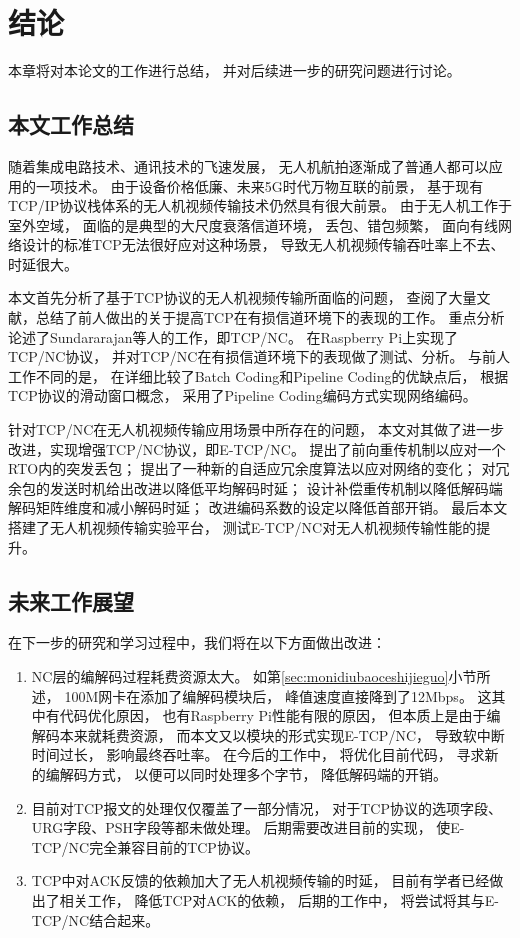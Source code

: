 \chapter*{结\qquad{}论}
本章将对本论文的工作进行总结，
并对后续进一步的研究问题进行讨论。
\section*{本文工作总结}
随着集成电路技术、通讯技术的飞速发展，
无人机航拍逐渐成了普通人都可以应用的一项技术。
由于设备价格低廉、未来5G时代万物互联的前景，
基于现有TCP/IP协议栈体系的无人机视频传输技术仍然具有很大前景。
由于无人机工作于室外空域，
面临的是典型的大尺度衰落信道环境，
丢包、错包频繁，
面向有线网络设计的标准TCP无法很好应对这种场景，
导致无人机视频传输吞吐率上不去、时延很大。
\par
本文首先分析了基于TCP协议的无人机视频传输所面临的问题，
查阅了大量文献，总结了前人做出的关于提高TCP在有损信道环境下的表现的工作。
重点分析论述了Sundararajan等人的工作，即TCP/NC。
在Raspberry Pi上实现了TCP/NC协议，
并对TCP/NC在有损信道环境下的表现做了测试、分析。
与前人工作不同的是，
在详细比较了Batch Coding和Pipeline Coding的优缺点后，
根据TCP协议的滑动窗口概念，
采用了Pipeline Coding编码方式实现网络编码。
\par
针对TCP/NC在无人机视频传输应用场景中所存在的问题，
本文对其做了进一步改进，实现增强TCP/NC协议，即E-TCP/NC。
提出了前向重传机制以应对一个RTO内的突发丢包；
提出了一种新的自适应冗余度算法以应对网络的变化；
对冗余包的发送时机给出改进以降低平均解码时延；
设计补偿重传机制以降低解码端解码矩阵维度和减小解码时延；
改进编码系数的设定以降低首部开销。
最后本文搭建了无人机视频传输实验平台，
测试E-TCP/NC对无人机视频传输性能的提升。

\section*{未来工作展望}
在下一步的研究和学习过程中，我们将在以下方面做出改进：
\begin{enumerate}[fullwidth,itemindent=2em,label=(\arabic*)]
	\item NC层的编解码过程耗费资源太大。
	如第\ref{sec:monidiubaoceshijieguo}小节所述，
	100M网卡在添加了编解码模块后，
	峰值速度直接降到了12Mbps。
	这其中有代码优化原因，
	也有Raspberry Pi性能有限的原因，
	但本质上是由于编解码本来就耗费资源，
	而本文又以模块的形式实现E-TCP/NC，
	导致软中断时间过长，
	影响最终吞吐率。
	在今后的工作中，
	将优化目前代码，
	寻求新的编解码方式，
	以便可以同时处理多个字节，
	降低解码端的开销。
	\item 目前对TCP报文的处理仅仅覆盖了一部分情况，
	对于TCP协议的选项字段、URG字段、PSH字段等都未做处理。
	后期需要改进目前的实现，
	使E-TCP/NC完全兼容目前的TCP协议。
	\item TCP中对ACK反馈的依赖加大了无人机视频传输的时延，
	目前有学者已经做出了相关工作\textsuperscript{\cite{ontheflycoding}}，
	降低TCP对ACK的依赖，
	后期的工作中，
	将尝试将其与E-TCP/NC结合起来。
\end{enumerate}